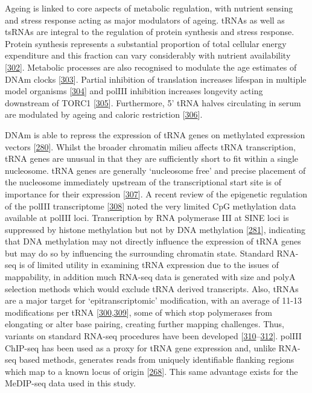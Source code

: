 \documentclass[
]{book}
\begin{document}
Ageing is linked to core aspects of metabolic regulation, with nutrient sensing and stress response acting as major modulators of ageing.
tRNAs as well as tsRNAs are integral to the regulation of protein synthesis and stress response.
Protein synthesis represents a substantial proportion of total cellular energy expenditure and this fraction can vary considerably with nutrient availability {[}\protect\hyperlink{ref-Pace2006}{302}{]}.
Metabolic processes are also recognised to modulate the age estimates of DNAm clocks {[}\protect\hyperlink{ref-Nwanaji-Enwerem2018}{303}{]}.
Partial inhibition of translation increases lifespan in multiple model organisms {[}\protect\hyperlink{ref-Hansen2007}{304}{]} and polIII inhibition increases longevity acting downstream of TORC1 {[}\protect\hyperlink{ref-Filer2017}{305}{]}.
Furthermore, 5' tRNA halves circulating in serum are modulated by ageing and caloric restriction {[}\protect\hyperlink{ref-Dhahbi2013}{306}{]}.

DNAm is able to repress the expression of tRNA genes on methylated expression vectors {[}\protect\hyperlink{ref-Besser1990}{280}{]}.
Whilst the broader chromatin milieu affects tRNA transcription, tRNA genes are unusual in that they are sufficiently short to fit within a single nucleosome.
tRNA genes are generally `nucleosome free' and precise placement of the nucleosome immediately upstream of the transcriptional start site is of importance for their expression {[}\protect\hyperlink{ref-Bhargava2013a}{307}{]}.
A recent review of the epigenetic regulation of the polIII transcriptome {[}\protect\hyperlink{ref-Park2017}{308}{]} noted the very limited CpG methylation data available at polIII loci.
Transcription by RNA polymerase III at SINE loci is suppressed by histone methylation but not by DNA methylation {[}\protect\hyperlink{ref-Varshney2015}{281}{]}, indicating that DNA methylation may not directly influence the expression of tRNA genes but may do so by influencing the surrounding chromatin state.
Standard RNA-seq is of limited utility in examining tRNA expression due to the issues of mappability, in addition much RNA-seq data is generated with size and polyA selection methods which would exclude tRNA derived transcripts.
Also, tRNAs are a major target for `epitranscriptomic' modification, with an average of 11-13 modifications per tRNA {[}\protect\hyperlink{ref-Schimmel2017}{300},\protect\hyperlink{ref-Wilusz2015}{309}{]}, some of which stop polymerases from elongating or alter base pairing, creating further mapping challenges.
Thus, variants on standard RNA-seq procedures have been developed {[}\protect\hyperlink{ref-Cozen2015}{310}--\protect\hyperlink{ref-Gogakos2017}{312}{]}.
polIII ChIP-seq has been used as a proxy for tRNA gene expression and, unlike RNA-seq based methods, generates reads from uniquely identifiable flanking regions which map to a known locus of origin {[}\protect\hyperlink{ref-Canella2010}{268}{]}.
This same advantage exists for the MeDIP-seq data used in this study.
\end{document}

